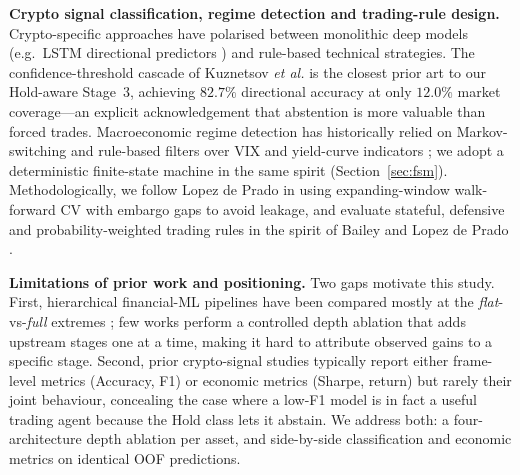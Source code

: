 \documentclass[conference]{IEEEtran}
\begin{document}
\textbf{Crypto signal classification, regime detection and trading-rule design.} Crypto-specific approaches have polarised between monolithic deep models (e.g.~LSTM directional predictors \cite{patel2015fusion,sezer2018cnn}) and rule-based technical strategies. The confidence-threshold cascade of Kuznetsov \emph{et al.} \cite{kuznetsov2025confidence} is the closest prior art to our Hold-aware Stage~3, achieving $82.7\%$ directional accuracy at only $12.0\%$ market coverage---an explicit acknowledgement that abstention is more valuable than forced trades. Macroeconomic regime detection has historically relied on Markov-switching \cite{hamilton1989markov} and rule-based filters over VIX and yield-curve indicators \cite{ang2002regime,andersen2003realized}; we adopt a deterministic finite-state machine in the same spirit (Section~\ref{sec:fsm}). Methodologically, we follow Lopez de Prado \cite{lopez2018amlfinance,lopez2018tenreasons} in using expanding-window walk-forward CV with embargo gaps to avoid leakage, and evaluate stateful, defensive and probability-weighted trading rules in the spirit of Bailey and Lopez de Prado \cite{bailey2014deflated}.

\textbf{Limitations of prior work and positioning.} Two gaps motivate this study. First, hierarchical financial-ML pipelines have been compared mostly at the \emph{flat}-vs-\emph{full} extremes \cite{zou2024cascadelstm}; few works perform a controlled depth ablation that adds upstream stages one at a time, making it hard to attribute observed gains to a specific stage. Second, prior crypto-signal studies typically report either frame-level metrics (Accuracy, F1) or economic metrics (Sharpe, return) but rarely their joint behaviour, concealing the case where a low-F1 model is in fact a useful trading agent because the Hold class lets it abstain. We address both: a four-architecture depth ablation per asset, and side-by-side classification and economic metrics on identical OOF predictions.
\end{document}
